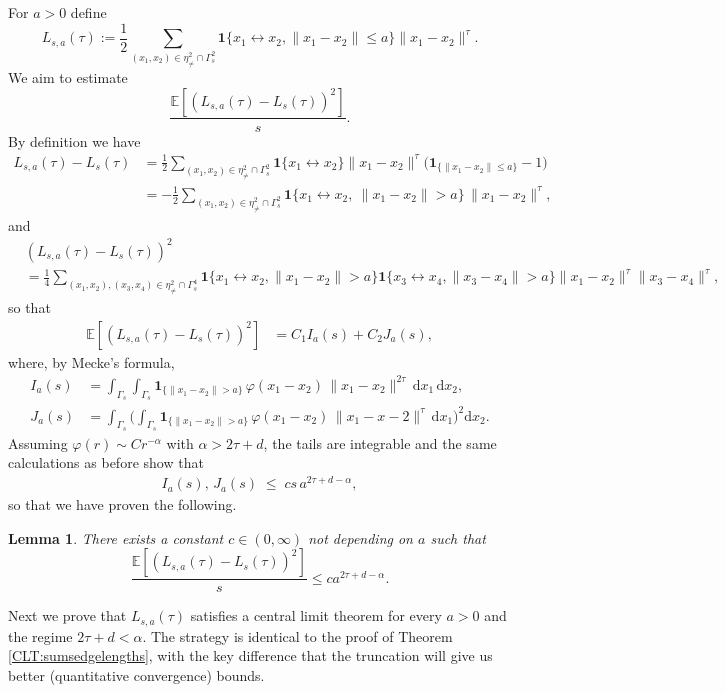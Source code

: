 \documentclass{article}
\newtheorem{lemma}[theorem]{Lemma}
\theoremstyle{definition}
\numberwithin{equation}{section}
\theoremstyle{remark}
\begin{document}
For $a>0$ define
$$
L_{s,a} (\tau):=\frac{1}{2} \sum_{(x_1, x_2) \in \eta^2_{\neq} \cap \Gamma_s^2} \mathbf{1}\{ x_1 \leftrightarrow x_2, \|x_1-x_2\|\leq a \} \| x_1- x_2 \|^\tau.
$$
We aim to estimate
$$
\frac{\mathbb{E}[(L_{s,a} (\tau)-L_{s} (\tau))^2]}{s}. %
$$
By definition we have
\begin{align*}
L_{s,a}(\tau)-L_{s}(\tau)
&= \frac{1}{2}\sum_{(x_1,x_2)\in\eta^2_{\neq}\cap \Gamma_s^2}
\mathbf{1}\{x_1\leftrightarrow x_2\}
\|x_1-x_2\|^{\tau}
\big(\mathbf{1}_{\{\|x_1-x_2\|\le a\}}-1\big) \\[0.4em]
&= -\frac{1}{2}\sum_{(x_1,x_2)\in\eta^2_{\neq}\cap \Gamma_s^2}
\mathbf{1}\{x_1\leftrightarrow x_2,\ \|x_1-x_2\|>a\}\,
\|x_1-x_2\|^{\tau},
\end{align*}
and
\begin{align*}
& (L_{s,a}(\tau)-L_{s}(\tau))^2\\
& = \frac{1}{4}\!\!\sum_{(x_1,x_2),(x_3,x_4)\in\eta^2_{\neq}\cap \Gamma_s^4}
\!\!\!\!\mathbf{1}\{x_1\leftrightarrow x_2,\|x_1-x_2\|>a\}
\mathbf{1}\{x_3\leftrightarrow x_4,\|x_3-x_4\|>a\}
\|x_1-x_2\|^{\tau}\|x_3-x_4\|^{\tau},
\end{align*}
so that
\begin{align*}
\mathbb{E}\!\left[(L_{s,a}(\tau)-L_{s}(\tau))^2\right]
&= C_1 I_a(s) + C_2 J_a(s),
\end{align*}
where, by Mecke’s formula,
\begin{align*}
I_a(s)
&= \int_{\Gamma_s}\!\!\int_{\Gamma_s}
\mathbf{1}_{\{\|x_1-x_2\|>a\}}\,
\varphi(x_1-x_2)\,\|x_1-x_2\|^{2\tau}\,\mathrm{d}x_1\,\mathrm{d}x_2, \\[0.3em]
J_a(s)
&= \int_{\Gamma_s}\!
\Bigg(\int_{\Gamma_s}
\mathbf{1}_{\{\|x_1-x_2\|>a\}}\,
\varphi(x_1-x_2)\,\|x_1-x-2\|^{\tau}\,\mathrm{d}x_1\Bigg)^{\!2}\mathrm{d}x_2.
\end{align*}
Assuming $\varphi(r)\sim C r^{-\alpha}$ with $\alpha>2\tau+d$, the tails are integrable and the same calculations as before show that
\begin{align*}
I_a(s),\,J_a(s)\;\leq \;cs\,a^{2\tau+d-\alpha},
\end{align*}
so that we have proven the following.

\begin{lemma}\label{truncationlemma1}
    There exists a constant $c \in (0,\infty)$ not depending on $a$ such that
    $$\frac{\mathbb{E}[(L_{s,a} (\tau)-L_{s} (\tau))^2]}{s} \leq c a^{2\tau+d-\alpha} .$$
\end{lemma}

Next we prove that $L_{s,a} (\tau)$ satisfies a central limit theorem for every $a>0$ and the regime $2\tau+d<\alpha$. The strategy is identical to the proof of Theorem \ref{CLT:sumsedgelengths}, with the key difference that the truncation will give us better (quantitative convergence) bounds.
\end{document}
